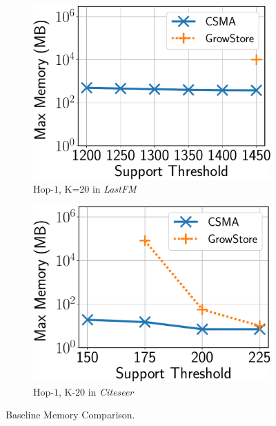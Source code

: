 \begin{figure}
	\vspace{4mm}
	\centering
	\begin{subfigure}[b]{0.25\textwidth}
		\includegraphics[keepaspectratio,scale=0.24]{img2/lastfm/lastfm_mem.pdf}
		\caption{\scriptsize {\sf Hop-$1$, K=$20$} in {\em LastFM}}
		\label{fig:lastfm_mem}
	\end{subfigure}%
	\begin{subfigure}[b]{0.25\textwidth}
		\includegraphics[keepaspectratio,scale=0.24]{img2/citeseer/citeseer_mem.pdf}
		\caption{\scriptsize {\sf Hop-$1$, K-$20$} in {\em Citeseer}}
		\label{fig:citeseer_mem}
	\end{subfigure}%
	\vspace{-2mm}
	\caption{\scriptsize {\sf Baseline Memory Comparison}.}
	\label{fig:mem_comp}
	\vspace{-2mm}
\end{figure}





